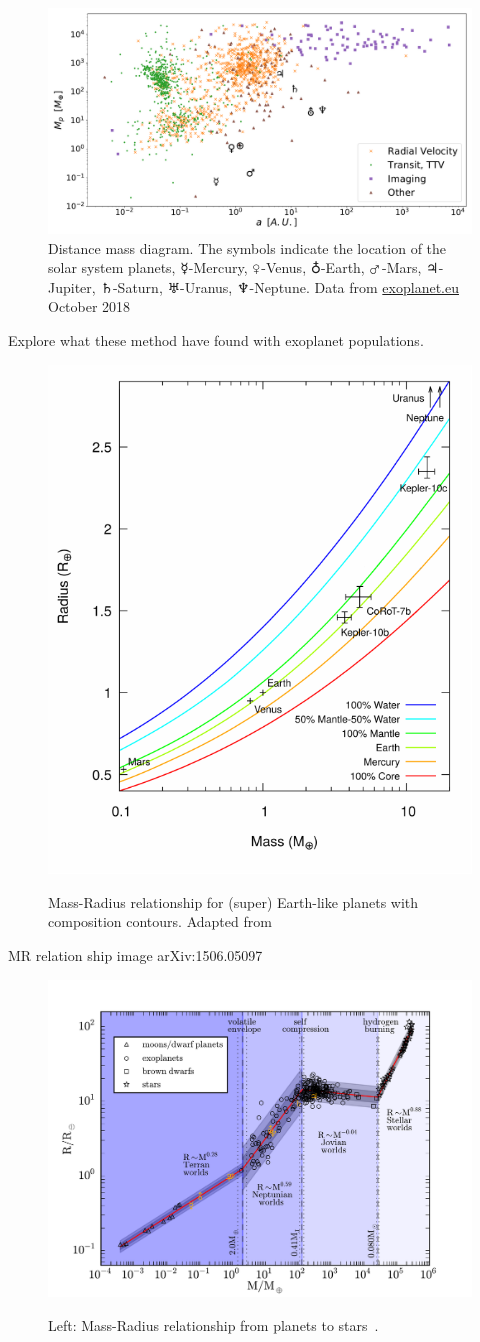 \begin{figure}
    \centering
    \includegraphics[width=0.\linewidth]{./figures/introduction/exoplanetEU_a_mass.pdf}
    \caption{Distance mass diagram.
        The symbols indicate the location of the solar system planets, $\mercury$-Mercury, $\venus$-Venus, $\earth$-Earth, $\mars$-Mars, $\jupiter$-Jupiter, $\saturn$-Saturn, $\uranus$-Uranus, $\neptune$-Neptune. Data from \href{http://ww.exoplanet.eu}{exoplanet.eu} October 2018}
    \label{fig:pltoverlayadd}
\end{figure}


Explore what these method have found with exoplanet populations.


\begin{figure}[t]
    \centering
    \includegraphics[width=0.4\linewidth]{./figures/introduction/Mass_radius_relation-compostion_Brugger_2017.pdf}\\
    \caption{Mass-Radius relationship for (super) Earth-like planets with composition contours. Adapted from~\citet{brugger_constraints_2017}}
    \label{fig:mass_radius_relation_composition}
\end{figure}

MR relation ship image arXiv:1506.05097~\citet{chen_probabilistic_2016}

\begin{figure}[t]
    \centering
    \includegraphics[width=0.9\linewidth]{./figures/introduction/mass_radius_relation.pdf}  \\
    \caption{Left: Mass-Radius relationship from planets to stars~\citet{chen_probabilistic_2016}.}
    \label{fig:mass_radius_relation}
\end{figure}


